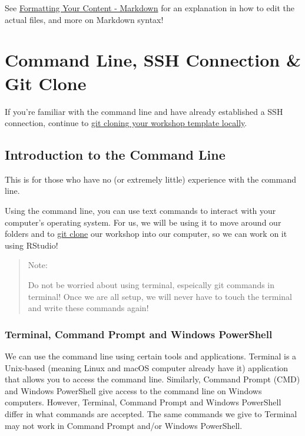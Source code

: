 \documentclass[
]{book}
\theoremstyle{definition}
\theoremstyle{definition}
\theoremstyle{definition}
\theoremstyle{definition}
\theoremstyle{remark}
\begin{document}
See \hyperref[formatting]{Formatting Your Content - Markdown} for an explanation in how to edit the actual files, and more on Markdown syntax!

\chapter{Command Line, SSH Connection \& Git Clone}\label{git-instruct}

If you're familiar with the command line and have already established a SSH connection, continue to \hyperref[git-clone]{git cloning your workshop template locally}.

\section{Introduction to the Command Line}\label{introduction-to-the-command-line}

This is for those who have no (or extremely little) experience with the command line.

Using the command line, you can use text commands to interact with your computer's operating system. For us, we will be using it to move around our folders and to \hyperref[git-clone]{git clone} our workshop into our computer, so we can work on it using RStudio!

\begin{quote}
Note:

Do not be worried about using terminal, espeically git commands in terminal! Once we are all setup, we will never have to touch the terminal and write these commands again!
\end{quote}

\subsection{Terminal, Command Prompt and Windows PowerShell}\label{terminal-command-prompt-and-windows-powershell}

We can use the command line using certain tools and applications. Terminal is a Unix-based (meaning Linux and macOS computer already have it) application that allows you to access the command line. Similarly, Command Prompt (CMD) and Windows PowerShell give access to the command line on Windows computers. However, Terminal, Command Prompt and Windows PowerShell differ in what commands are accepted. The same commands we give to Terminal may not work in Command Prompt and/or Windows PowerShell.
\end{document}
